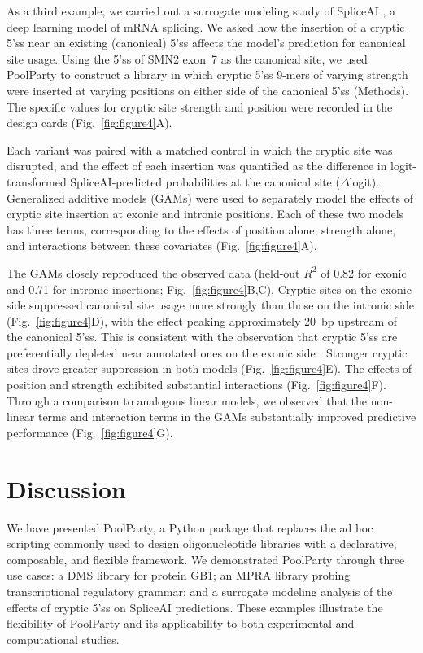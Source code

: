 \documentclass[twoside]{kinneylab_preprintstyle}
\begin{document}
As a third example, we carried out a surrogate modeling study of SpliceAI \citep{Jaganathan2019ps}, a deep learning model of mRNA splicing. We asked how the insertion of a cryptic 5'ss near an existing (canonical) 5'ss affects the model's prediction for canonical site usage. Using the 5'ss of SMN2 exon~7 as the canonical site, we used PoolParty to construct a library in which cryptic 5'ss 9-mers of varying strength were inserted at varying positions on either side of the canonical 5'ss (Methods). The specific values for cryptic site strength and position were recorded in the design cards (Fig.~\ref{fig:figure4}A).

Each variant was paired with a matched control in which the cryptic site was disrupted, and the effect of each insertion was quantified as the difference in logit-transformed SpliceAI-predicted probabilities at the canonical site ($\Delta$logit). Generalized additive models (GAMs) were used to separately model the effects of cryptic site insertion at exonic and intronic positions. Each of these two models has three terms, corresponding to the effects of position alone, strength alone, and interactions between these covariates (Fig.~\ref{fig:figure4}A).

The GAMs closely reproduced the observed data (held-out $R^2$ of 0.82 for exonic and 0.71 for intronic insertions; Fig.~\ref{fig:figure4}B,C). Cryptic sites on the exonic side suppressed canonical site usage more strongly than those on the intronic side (Fig.~\ref{fig:figure4}D), with the effect peaking approximately 20~bp upstream of the canonical 5'ss. This is consistent with the observation that cryptic 5'ss are preferentially depleted near annotated ones on the exonic side \citep{Dawes2022empirical}. Stronger cryptic sites drove greater suppression in both models (Fig.~\ref{fig:figure4}E). The effects of position and strength exhibited substantial interactions (Fig.~\ref{fig:figure4}F). Through a comparison to analogous linear models, we observed that the non-linear terms and interaction terms in the GAMs substantially improved predictive performance (Fig.~\ref{fig:figure4}G).

\section*{Discussion}

We have presented PoolParty, a Python package that replaces the ad hoc scripting commonly used to design oligonucleotide libraries with a declarative, composable, and flexible framework. We demonstrated PoolParty through three use cases: a DMS library for protein GB1; an MPRA library probing transcriptional regulatory grammar; and a surrogate modeling analysis of the effects of cryptic 5'ss on SpliceAI predictions. These examples illustrate the flexibility of PoolParty and its applicability to both experimental and computational studies.
\end{document}
